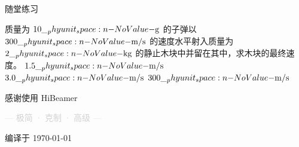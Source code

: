 \documentclass[darkmode=false, randomquote=true, quoteseed=2026, shownav=false,handout=false]{HiBeamer}
\begin{document}
\begin{frame}{随堂练习}
  \begin{ExerciseList}[0]
  	\item 
    质量为 $10\Ug$ 的子弹以 $300\Ums$ 的速度水平射入质量为 $2\Ukg$
    的静止木块中并留在其中，求木块的最终速度。
    \fourchoices[answer=B]
    {$0\Ums$}
    {$1.5\Ums$}
    {$3.0\Ums$}
    {$300\Ums$}
  \end{ExerciseList}

\end{frame}

\begin{frame}[plain]
  \vfill
  \begin{center}
    {\textcolor{PrimaryNavy}{感谢使用 HiBeamer}}

    \vspace{1cm}

    {\large\textcolor{LightGray}{--- 极简 · 克制 · 高级 ---}}

    \vspace{0.5cm}

    {\footnotesize\textcolor{LightGray!60}{编译于 \today}}
  \end{center}
  \vfill
\end{frame}
\end{document}
